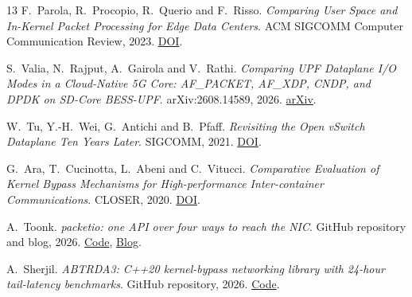 \documentclass[11pt,a4paper]{article}
\begin{document}
\begin{thebibliography}{13}
F.~Parola, R.~Procopio, R.~Querio and F.~Risso.
\emph{Comparing User Space and In-Kernel Packet Processing for Edge Data Centers}.
ACM SIGCOMM Computer Communication Review, 2023.
\href{https://doi.org/10.1145/3594255.3594257}{DOI}.

S.~Valia, N.~Rajput, A.~Gairola and V.~Rathi.
\emph{Comparing UPF Dataplane I/O Modes in a Cloud-Native 5G Core: AF\_PACKET, AF\_XDP, CNDP, and DPDK on SD-Core BESS-UPF}.
arXiv:2608.14589, 2026.
\href{https://arxiv.org/abs/2608.14589}{arXiv}.

W.~Tu, Y.-H.~Wei, G.~Antichi and B.~Pfaff.
\emph{Revisiting the Open vSwitch Dataplane Ten Years Later}.
SIGCOMM, 2021.
\href{https://doi.org/10.1145/3452296.3472914}{DOI}.

G.~Ara, T.~Cucinotta, L.~Abeni and C.~Vitucci.
\emph{Comparative Evaluation of Kernel Bypass Mechanisms for High-performance Inter-container Communications}.
CLOSER, 2020.
\href{https://doi.org/10.5220/0009321200440055}{DOI}.

A.~Toonk.
\emph{packetio: one API over four ways to reach the NIC}.
GitHub repository and blog, 2026.
\href{https://github.com/atoonk/packetio}{Code}, \href{https://toonk.io/packetio/}{Blog}.

A.~Sherjil.
\emph{ABTRDA3: C++20 kernel-bypass networking library with 24-hour tail-latency benchmarks}.
GitHub repository, 2026.
\href{https://github.com/ASherjil/ABTRDA3}{Code}.

\end{thebibliography}
\end{document}
